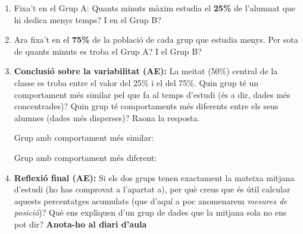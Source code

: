 \documentclass[12pt,a4paper]{article}
\begin{document}
\begin{enumerate}[label=\alph*)]
\begin{minipage}{0.48\textwidth}
\begin{center}
        \end{center}
    \end{minipage}
    
    \vspace{0.5cm}
    
    \item Fixa't en el Grup A: Quants minuts màxim estudia el \textbf{25\%} de l'alumnat que hi dedica menys temps? I en el Grup B? \vspace{1cm}
    
    \item Ara fixa't en el \textbf{75\%} de la població de cada grup que estudia menys. Per sota de quants minuts es troba el Grup A? I el Grup B? \vspace{1cm}
    
    \item \textbf{Conclusió sobre la variabilitat (AE):} La meitat (50\%) central de la classe es troba entre el valor del 25\% i el del 75\%. Quin grup té un comportament més similar pel que fa al temps d'estudi (és a dir, dades més concentrades)? Quin grup té comportaments més diferents entre els seus alumnes (dades més disperses)? Raona la resposta.
    
    \vspace{0.1cm}
    Grup amb comportament més similar: 
    
    \vspace{0.3cm}
    Grup amb comportament més diferent:
    
    \item \textbf{Reflexió final (AE):} Si els dos grups tenen exactament la mateixa mitjana d'estudi (ho has comprovat a l'apartat a), per què creus que és útil calcular aquests percentatges acumulats (que d'aquí a poc anomenarem \textit{mesures de posició})? Què ens expliquen d'un grup de dades que la mitjana sola no ens pot dir? \textbf{Anota-ho al diari d'aula}
    
\end{enumerate}
\end{document}
